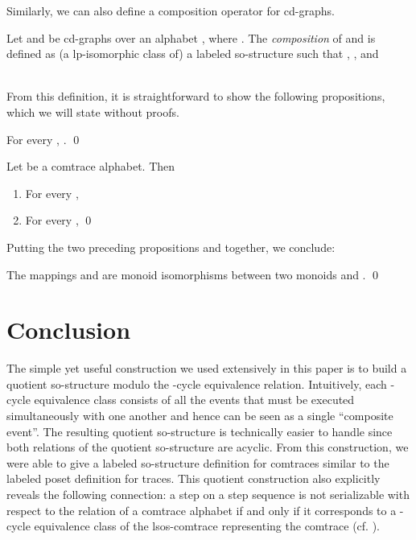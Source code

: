 \documentclass{llncs}
\begin{document}
Similarly, we can also define a composition operator for cd-graphs.
\begin{definition} Let  and  be cd-graphs over an alphabet , where . The \emph{composition}  of  and  is defined as (a lp-isomorphic class of) a labeled so-structure  such that , , and \smallskip\\
\mbox{\hspace{1.5cm}}\\
\mbox{\hspace{1.5cm}} \EOD
\end{definition}

From this definition, it is straightforward to show the following propositions, which we will state without proofs.

\begin{proposition}
For every , . \qed 
\end{proposition}

\begin{proposition}  Let  be a comtrace alphabet. Then  
\begin{enumerate}
\item For every , 
\item For every ,  \qed
\end{enumerate}
\label{prop:hom2}
\end{proposition}

Putting the two preceding propositions  and  together, we conclude:
\begin{theorem}
The mappings  and  are monoid isomorphisms between two monoids  and . \qed
\end{theorem}


\section{Conclusion}

The simple yet useful construction we used extensively in this paper is to build a quotient so-structure modulo the -cycle equivalence relation. Intuitively, each -cycle equivalence class consists of all the events that must be executed simultaneously with one another and hence can be seen as a single ``composite event''.  The resulting quotient so-structure  is technically  easier to handle since both relations of the quotient so-structure are acyclic. From this construction, we were able to give a labeled so-structure definition for comtraces similar to the labeled poset definition for traces. This quotient construction also explicitly  reveals the following connection: a step on a step sequence  is not serializable with respect to  the relation  of a comtrace alphabet if and only if it corresponds to a -cycle equivalence class of the lsos-comtrace representing the comtrace  (cf. ). 
\end{document}
